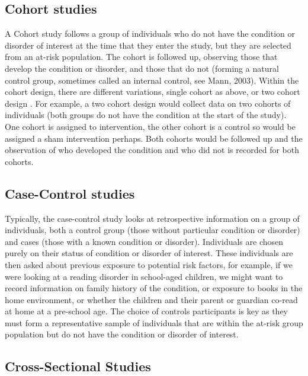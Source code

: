 \documentclass[]{book}
\begin{document}
\hypertarget{cohort-studies}{%
\subsection{Cohort studies}\label{cohort-studies}}

A Cohort study follows a group of individuals who do not have the condition or disorder of interest at the time that they enter the study, but they are selected from an at-risk population. The cohort is followed up, observing those that develop the condition or disorder, and those that do not (forming a natural control group, sometimes called an internal control, see Mann, 2003). Within the cohort design, there are different variations, single cohort as above, or two cohort design . For example, a two cohort design would collect data on two cohorts of individuals (both groups do not have the condition at the start of the study). One cohort is assigned to intervention, the other cohort is a control so would be assigned a sham intervention perhaps. Both cohorts would be followed up and the observation of who developed the condition and who did not is recorded for both cohorts.

\hypertarget{case-control-studies}{%
\subsection{Case-Control studies}\label{case-control-studies}}

Typically, the case-control study looks at retrospective information on a group of individuals, both a control group (those without particular condition or disorder) and cases (those with a known condition or disorder). Individuals are chosen purely on their status of condition or disorder of interest. These individuals are then asked about previous exposure to potential risk factors, for example, if we were looking at a reading disorder in school-aged children, we might want to record information on family history of the condition, or exposure to books in the home environment, or whether the children and their parent or guardian co-read at home at a pre-school age. The choice of controls participants is key as they must form a representative sample of individuals that are within the at-risk group population but do not have the condition or disorder of interest.

\hypertarget{cross-sectional-studies}{%
\subsection{Cross-Sectional Studies}\label{cross-sectional-studies}}
\end{document}
